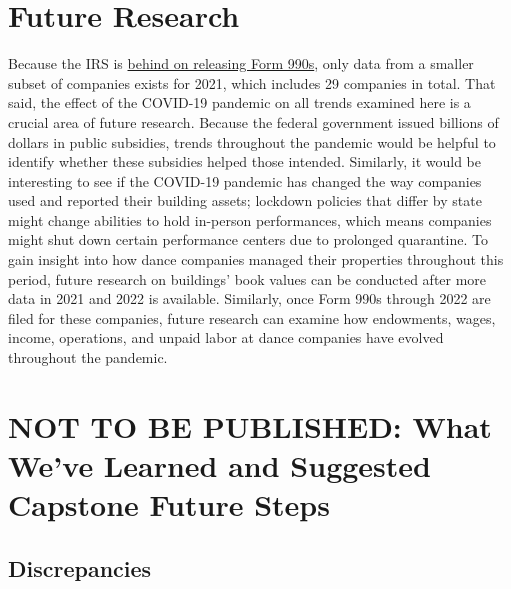 \documentclass[Dance Data
Project,article,submit,moreauthors,pdftex]{mdpi}
\begin{document}
\hypertarget{future-research}{%
\section{Future Research}\label{future-research}}

Because the IRS is
\href{https://www.propublica.org/article/irs-hasnt-released-nearly-half-million-nonprofit-tax-records}{behind
on releasing Form 990s}, only data from a smaller subset of companies
exists for 2021, which includes 29 companies in total. That said, the
effect of the COVID-19 pandemic on all trends examined here is a crucial
area of future research. Because the federal government issued billions
of dollars in public subsidies, trends throughout the pandemic would be
helpful to identify whether these subsidies helped those intended.
Similarly, it would be interesting to see if the COVID-19 pandemic has
changed the way companies used and reported their building assets;
lockdown policies that differ by state might change abilities to hold
in-person performances, which means companies might shut down certain
performance centers due to prolonged quarantine. To gain insight into
how dance companies managed their properties throughout this period,
future research on buildings' book values can be conducted after more
data in 2021 and 2022 is available. Similarly, once Form 990s through
2022 are filed for these companies, future research can examine how
endowments, wages, income, operations, and unpaid labor at dance
companies have evolved throughout the pandemic.

\hypertarget{not-to-be-published-what-weve-learned-and-suggested-capstone-future-steps}{%
\section{NOT TO BE PUBLISHED: What We've Learned and Suggested Capstone
Future
Steps}\label{not-to-be-published-what-weve-learned-and-suggested-capstone-future-steps}}

\hypertarget{discrepancies}{%
\subsection{Discrepancies}\label{discrepancies}}
\end{document}
